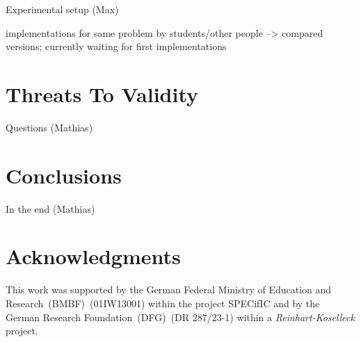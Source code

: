 \documentclass[conference]{IEEEtran}
\begin{document}
\danger Experimental setup (Max)

\danger implementations for same problem by students/other people --> compared
versions; currently waiting for first implementations

\section{Threats To Validity}
\label{sec:threats-validity}

\danger Questions (Mathias)

\section{Conclusions}
\label{sec:conclusions}

\danger In the end (Mathias)

\section*{Acknowledgments}
\label{sec:acknowledgments}
This work was supported by the German Federal Ministry of Education and
Research~(BMBF)~(01IW13001) within the project SPECifIC and by the German
Research Foundation~(DFG)~(DR 287/23-1) within a \emph{Reinhart-Koselleck}
project.




\end{document}
